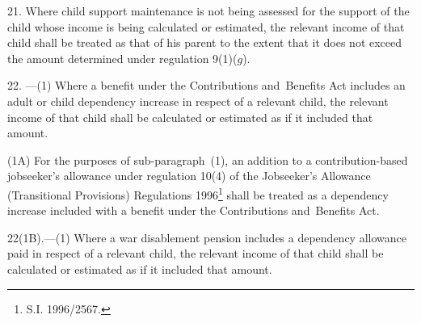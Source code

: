 \documentclass[12pt,a4paper]{article}
\begin{document}

\medskip

21.  Where child support maintenance is not being assessed for the support of the child whose income is being calculated or estimated, the relevant income of that child shall be treated as that of his parent to the extent that it does not exceed the amount determined under regulation 9(1)($g$).

\medskip

22.%
---(1)  %
  Where a benefit under the Contributions and~Benefits Act includes an adult or child dependency increase in respect of a relevant child, the relevant income of that child shall be calculated or estimated as if it included that amount.

(1A) For the purposes of sub-paragraph~(1), an addition to a contribution-based jobseeker’s allowance under 
regulation 10(4)  %
of the Jobseeker’s Allowance (Transitional Provisions) Regulations 
1996\footnote{\frenchspacing S.I. 1996/2567.}  %
shall be treated as a dependency increase included with a benefit under the Contributions and~Benefits Act.


\medskip

22(1B).—(1) Where a war disablement pension includes a dependency allowance paid in respect of a relevant child, the relevant income of that child shall be calculated or estimated as if it included that amount.
\end{document}
